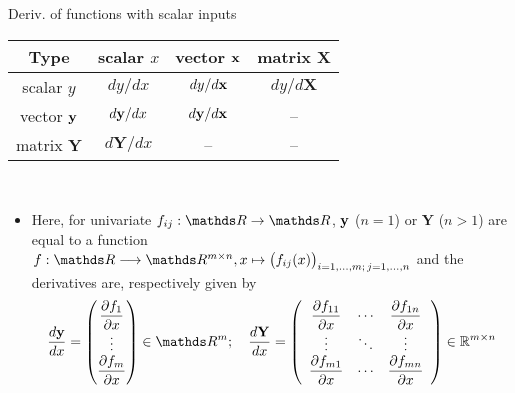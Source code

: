 \documentclass[11pt,compress,t,notes=noshow, xcolor=table]{beamer}
\newcommand{\deriv}{d}
\begin{document}
\begin{vbframe}{Deriv. of functions with scalar inputs}
        \begin{table}
            \centering
            \begin{tabular}{c||c|c|c}
                 Type & scalar $x$ & vector $\mathbf{x}$ & matrix $\mathbf{X}$ \\ \hline\hline
                 scalar $y$ & $\deriv y / \deriv x$ & $\deriv y / \deriv\xv$ & $\deriv y / \deriv\mathbf{X}$ \\ \hline
                 vector $\mathbf{y}$ & \cellcolor{customblue}$\deriv\yv / \deriv x$ & $\deriv\yv / \deriv\xv$ & -- \\ \hline
                 matrix $\mathbf{Y}$ & \cellcolor{customblue}$\deriv\mathbf{Y} / \deriv x$ & -- & --
            \end{tabular}
        \end{table}\,\\
        \begin{itemize}
        \item  Here, for univariate $f_{ij}:\R\rightarrow\R$, $\mathbf{y}$ ($n=1$) or $\mathbf{Y}$ ($n>1$) are equal to a function $f: \R\longrightarrow\R^{m\times n}, x\mapsto \big(f_{ij}(x)\big)_{i=1,\dots,m;\,j=1,\dots,n}$ and the derivatives are, respectively given by $$
        \frac{\deriv\yv}{\deriv x}=\begin{pmatrix}
            \dfrac{\partial f_{1}}{\partial x}\\\vdots\\ \dfrac{\partial f_{m}}{\partial x}
        \end{pmatrix}\in\R^m;\quad
        \frac{\deriv\mathbf{Y}}{\deriv x}=\left(\begin{array}{ccc}
\dfrac{\partial f_{11}}{\partial x} & \cdots & \dfrac{\partial f_{1 n}}{\partial x} \\
\vdots & \ddots & \vdots \\
\dfrac{\partial f_{m 1}}{\partial x} & \cdots & \dfrac{\partial f_{m n}}{\partial x}
\end{array}\right) \in \mathbb{R}^{m \times n}$$
        \end{itemize}
\end{vbframe}
\end{document}
